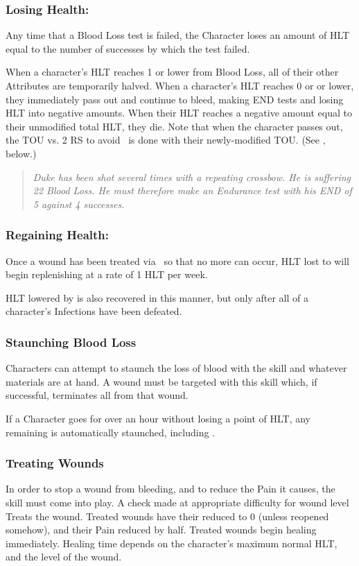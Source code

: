 \documentclass[oneside,11pt,english]{book}
\begin{document}
\subsubsection{Losing Health:}
Any time that a Blood Loss test is failed, the Character loses an amount of HLT equal to the number of 
successes by which the test failed.

When a character's HLT reaches 1 or lower from Blood Loss, all of their other Attributes are temporarily halved. When a character’s HLT reaches 0 or or lower, they immediately pass out and continue to bleed, making END tests and losing HLT into negative amounts. When their HLT reaches a negative amount equal to their unmodified total HLT, they die. Note that when the character passes out, the TOU vs. 2 RS to avoid ~is done with their newly-modified TOU. (See , below.)

\begin{quote}
	\emph{Duke has been shot several times with a repeating crossbow. He is suffering 22 Blood Loss. He must therefore make an Endurance test with his END of 5 against 4 successes.}
\end{quote}
\subsubsection{Regaining Health:}
Once a wound has been treated via ~so that no more  can occur, HLT lost to  will begin replenishing at a rate of 1 HLT per week.

HLT lowered by  is also recovered in this manner, but only after all of a character’s Infections have been defeated.

\subsubsection{Staunching Blood Loss}
Characters can attempt to staunch the loss of blood with the  skill and whatever materials are at hand. A wound must be targeted with this skill which, if successful, terminates all  from that wound.

If a Character goes for over an hour without losing a point of HLT, any remaining  is automatically staunched, including .

\subsubsection{Treating Wounds}
In order to stop a wound from bleeding, and to reduce the Pain it causes, the  skill must come into 
play. A  check made at appropriate difficulty for wound level Treats the wound. Treated wounds 
have their  reduced to 0 (unless reopened somehow), and their Pain reduced by half. Treated 
wounds begin healing immediately. Healing time depends on the character’s maximum normal HLT, and 
the level of the wound. 
\end{document}
